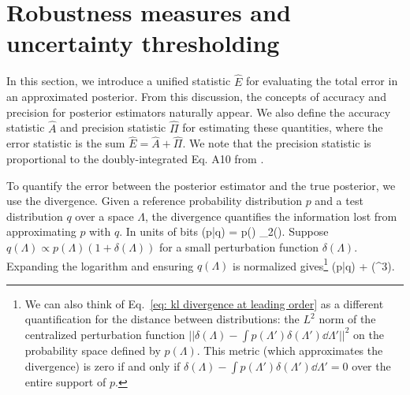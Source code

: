 \section{Robustness measures and uncertainty thresholding}
\label{sec: mc robustness measures}

In this section, we introduce a unified statistic $\hat{E}$ for evaluating the total error in an approximated posterior. From this discussion, the concepts of accuracy and precision for posterior estimators naturally appear. We also define the accuracy statistic $\hat{A}$ and precision statistic $\hat{\Pi}$ for estimating these quantities, where the error statistic is the sum $\hat{E} = \hat{A} + \hat{\Pi}$. We note that the precision statistic is proportional to the doubly-integrated Eq. A10 from \citet{Essick:2022ojx}.

To quantify the error between the posterior estimator and the true posterior, we use the \KL divergence. Given a reference probability distribution $p$ and a test distribution $q$ over a space $\Lambda$, the \KL divergence quantifies the information lost from approximating $p$ with $q$. In units of bits \citep{MacKay2003}
\beq
\KLD(p|q) = \int p(\Lambda) \log_2\left(\right)\dd\Lambda.
\label{eq: kl divergence}
\eeq
Suppose $q(\Lambda) \propto p(\Lambda)(1+\delta(\Lambda))$ for a small perturbation function $\delta(\Lambda)$. Expanding the logarithm and ensuring $q(\Lambda)$ is normalized gives\footnote{We can also think of Eq.~\ref{eq: kl divergence at leading order} as a different quantification for the distance between distributions: the $L^2$ norm of the centralized perturbation function $||\delta(\Lambda) - \int p(\Lambda')\delta(\Lambda')\dd\Lambda'||^2$ on the probability space defined by $p(\Lambda)$. This metric (which approximates the \KL divergence) is zero if and only if $\delta(\Lambda)-\int p(\Lambda')\delta(\Lambda')\dd\Lambda' = 0$ over the entire support of $p$.}
\beq
\KLD(p|q) \approx {}  + (\delta^3).
\label{eq: kl divergence at leading order}
\eeq

